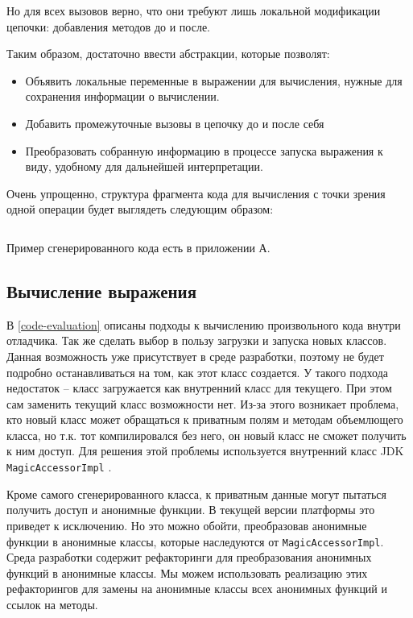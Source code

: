 Но для всех вызовов верно, что они требуют лишь локальной модификации цепочки: добавления методов до и после. 

Таким образом, достаточно ввести абстракции, которые позволят:
\begin{itemize}
	\item Объявить локальные переменные в выражении для вычисления, нужные для сохранения информации о вычислении.
	\item Добавить промежуточные вызовы в цепочку до и после себя
	\item Преобразовать собранную информацию в процессе запуска выражения к виду, удобному для дальнейшей интерпретации.
\end{itemize}

Очень упрощенно, структура фрагмента кода для вычисления с точки зрения одной операции будет выглядеть следующим образом:

\inputminted{java}{chapter3/code/EvalCode.java}

Пример сгенерированного кода есть в приложении А.

\subsection{Вычисление выражения}
В \ref{code-evaluation} описаны подходы к вычислению произвольного кода внутри отладчика. Так же сделать выбор в пользу загрузки и запуска новых классов. Данная возможность уже присутствует в среде разработки, поэтому не будет подробно останавливаться на том, как этот класс создается. У такого подхода недостаток -- класс загружается как внутренний класс для текущего. При этом сам заменить текущий класс возможности нет. Из-за этого возникает проблема, кто новый класс может обращаться к приватным полям и методам объемлющего класса, но т.к. тот компилировался без него, он новый класс не сможет получить к ним доступ. Для решения этой проблемы используется внутренний класс JDK \texttt{MagicAccessorImpl} \cite{magic}.

Кроме самого сгенерированного класса, к приватным данные могут пытаться получить доступ и анонимные функции. В текущей версии платформы это приведет к исключению. Но это можно обойти, преобразовав анонимные функции в анонимные классы, которые наследуются от \texttt{MagicAccessorImpl}. Среда разработки содержит рефакторинги для преобразования анонимных функций в анонимные классы. Мы можем использовать реализацию этих рефакторингов для замены на анонимные классы всех анонимных функций и ссылок на методы.

